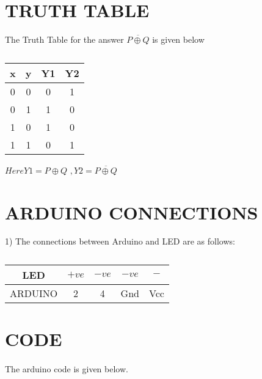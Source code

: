 \documentclass[a4paper,11pt,twocolumn]{article}
\begin{document}
\section{TRUTH TABLE}
The Truth Table for the answer $\overline{P \oplus Q}$  is given below
\bigskip
\bigskip
\begin{table}[ht!]
	\centering
\begin{tabular}{ |c |c |c |c |} 
\hline 
\newline 
	\textbf{x} & \textbf{y} & \textbf{Y1} & \textbf{Y2} \\
\hline  
	0 & 0 & 0 &1 \\   
	0 & 1 & 1 &0 \\ 
	1 & 0 & 1 &0 \\  
	1 & 1 & 0 &1\\  

\hline 
\end{tabular}
$Here Y1 = P \oplus Q$
$ ,Y2 = \overline{P \oplus Q}$
\caption{}
\end{table}
\bigskip
\bigskip

\section{ARDUINO CONNECTIONS}

1) The connections between Arduino and LED are as follows:
\begin{table}[ht!] 
    \centering 
    \begin{tabular}{|c|c|c|c|c|} 
    \hline 
       LED& $+ve$&$-ve$&$-ve$&$-$ \\ 
       \hline 
    ARDUINO& 2&4&Gnd&Vcc \\ 
    \hline 
    \end{tabular} 
    \caption{} 
\end{table} 
\bigskip
\bigskip
\bigskip
\section{CODE}
\paragraph{}
	The arduino code is given below.
\begin{center} 
\end{center}
\end{document}
